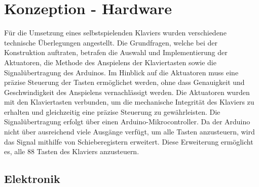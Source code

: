 \graphicspath{ {./img/} }

\chapter{Konzeption - Hardware}\label{Hardware - Konzeption}

\nocite{*}

Für die Umsetzung eines selbstspielenden Klaviers wurden verschiedene technische Überlegungen angestellt.
Die Grundfragen, welche bei der Konstruktion auftraten, betrafen die Auswahl und Implementierung der
Aktuatoren, die Methode des Anspielens der Klaviertasten sowie die Signalübertragung des Arduinos.
Im Hinblick auf die Aktuatoren muss eine präzise Steuerung der Tasten
ermöglichet werden, ohne dass Genauigkeit und Geschwindigkeit des Anspielens vernachlässigt werden.
\newline
Die Aktuatoren wurden mit den Klaviertasten verbunden, um die mechanische Integrität des Klaviers
zu erhalten und gleichzeitig eine präzise Steuerung zu gewährleisten.\newline
Die Signalübertragung erfolgt über einen Arduino-Mikrocontroller. Da der Arduino nicht über ausreichend
viele Ausgänge verfügt, um alle Tasten anzusteuern, wird das Signal mithilfe von Schieberegistern erweitert.
Diese Erweiterung ermöglicht es, alle 88 Tasten des Klaviers anzusteuern.

\section{Elektronik}\label{Vorgehen - Hardware}


